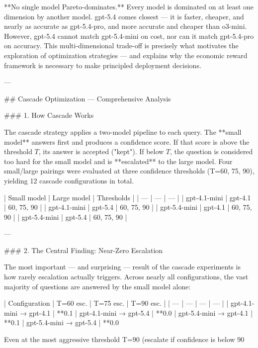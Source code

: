 **No single model Pareto-dominates.** Every model is dominated on at least one dimension by another model. gpt-5.4 comes closest — it is faster, cheaper, and nearly as accurate as gpt-5.4-pro, and more accurate and cheaper than o3-mini. However, gpt-5.4 cannot match gpt-5.4-mini on cost, nor can it match gpt-5.4-pro on accuracy. This multi-dimensional trade-off is precisely what motivates the exploration of optimization strategies — and explains why the economic reward framework is necessary to make principled deployment decisions.

---

## Cascade Optimization — Comprehensive Analysis

### 1. How Cascade Works

The cascade strategy applies a two-model pipeline to each query. The **small model** answers first and produces a confidence score. If that score is above the threshold $T$, its answer is accepted ("kept"). If below $T$, the question is considered too hard for the small model and is **escalated** to the large model. Four small/large pairings were evaluated at three confidence thresholds (T=60, 75, 90), yielding 12 cascade configurations in total.

| Small model | Large model | Thresholds |
| --- | --- | --- |
| gpt-4.1-mini | gpt-4.1 | 60, 75, 90 |
| gpt-4.1-mini | gpt-5.4 | 60, 75, 90 |
| gpt-5.4-mini | gpt-4.1 | 60, 75, 90 |
| gpt-5.4-mini | gpt-5.4 | 60, 75, 90 |

---

### 2. The Central Finding: Near-Zero Escalation

The most important — and surprising — result of the cascade experiments is how rarely escalation actually triggers. Across nearly all configurations, the vast majority of questions are answered by the small model alone:

| Configuration | T=60 esc. | T=75 esc. | T=90 esc. |
| --- | --- | --- | --- |
| gpt-4.1-mini → gpt-4.1 | **0.1%
| gpt-4.1-mini → gpt-5.4 | **0.0%
| gpt-5.4-mini → gpt-4.1 | **0.1%
| gpt-5.4-mini → gpt-5.4 | **0.0%

Even at the most aggressive threshold T=90 (escalate if confidence is below 90%

